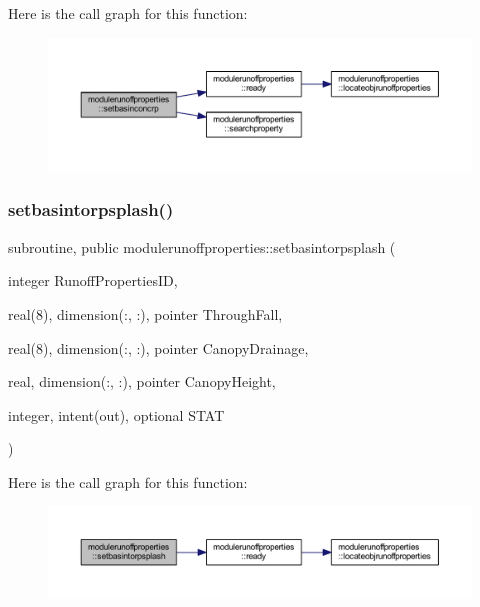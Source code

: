 Here is the call graph for this function\+:\nopagebreak
\begin{figure}[H]
\begin{center}
\leavevmode
\includegraphics[width=350pt]{namespacemodulerunoffproperties_a5a59647a877b86974489e072330e3b92_cgraph}
\end{center}
\end{figure}
\mbox{\label{namespacemodulerunoffproperties_a38a9e34b9711a489d98165b72541a7b6}} 
\subsubsection{\texorpdfstring{setbasintorpsplash()}{setbasintorpsplash()}}
{\footnotesize\ttfamily subroutine, public modulerunoffproperties\+::setbasintorpsplash (\begin{DoxyParamCaption}\item[{integer}]{Runoff\+Properties\+ID,  }\item[{real(8), dimension(\+:, \+:), pointer}]{Through\+Fall,  }\item[{real(8), dimension(\+:, \+:), pointer}]{Canopy\+Drainage,  }\item[{real, dimension(\+:, \+:), pointer}]{Canopy\+Height,  }\item[{integer, intent(out), optional}]{S\+T\+AT }\end{DoxyParamCaption})}

Here is the call graph for this function\+:\nopagebreak
\begin{figure}[H]
\begin{center}
\leavevmode
\includegraphics[width=350pt]{namespacemodulerunoffproperties_a38a9e34b9711a489d98165b72541a7b6_cgraph}
\end{center}
\end{figure}
\mbox{\label{namespacemodulerunoffproperties_af1a385e164dd67d336a71fada3a6e2b2}} 
